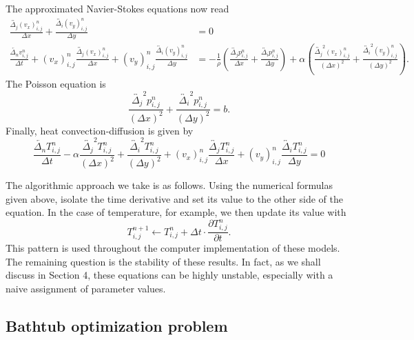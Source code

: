 \documentclass[12pt]{amsart}
\newcommand{\la}{\overleftarrow}
\newcommand{\ca}{\overleftrightarrow}
\begin{document}
The approximated Navier-Stokes equations now read
\begin{align}
    \frac{\ca{\Delta_{j}}(v_x)_{i,j}^n}{\Delta x} +
    \frac{\ca{\Delta_{i}}(v_y)_{i,j}^n}{\Delta y} &= 0 \\
    \frac{\la{\Delta_n}v^{n}_{i,j}}{\Delta t} + (v_x)_{i,j}^{n}
    \frac{\ca{\Delta_{j}}(v_x)_{i,j}^n}{\Delta x} + (v_y)_{i,j}^n
    \frac{\ca{\Delta_{i}}(v_y)_{i,j}^n}{\Delta y} &=
    -\frac{1}{\rho} \left(  \frac{\ca{\Delta_j}p_{i,j}^n}{\Delta
    x}+\frac{\ca{\Delta_i}p_{i,j}^n}{\Delta y}  \right) + \alpha
    \left(\frac{\ca{\Delta_{j}}^2(v_x)_{i,j}^n}{(\Delta x)^2} + 
    \frac{\ca{\Delta_{i}}^2(v_y)_{i,j}^n}{(\Delta y)^2}
    \right).
\end{align}
The Poisson equation is 
\begin{equation}
    \frac{\ca{\Delta_{j}}^2p_{i,j}^n}{(\Delta x)^2} + 
    \frac{\ca{\Delta_{i}}^2p_{i,j}^n}{(\Delta y)^2}
    = b.
    \label{eq:\theequation}
\end{equation}
Finally, heat convection-diffusion is given by
\begin{equation}
    \frac{\la{\Delta_n}T_{i,j}^n}{\Delta t} - \alpha \frac{\ca{\Delta_{j}}^2T_{i,j}^n}{(\Delta x)^2} + 
    \frac{\ca{\Delta_{i}}^2T_{i,j}^n}{(\Delta y)^2} + (v_x)_{i,j}^n
    \frac{\ca{\Delta_{j}}T_{i,j}^n}{\Delta x} + (v_y)_{i,j}^n
    \frac{\ca{\Delta_{i}}T_{i,j}^n}{\Delta y} = 0
    \label{eq:\theequation}
\end{equation}

The algorithmic approach we take is as follows. Using the numerical formulas
given above, isolate the time derivative and set its value to the other side of
the equation. In the case of temperature, for example, we then update its value
with
\begin{equation}
    T_{i,j}^{n+1} \leftarrow T_{i,j}^{n} + \Delta t \cdot \frac{\partial
        T_{i,j}^n}{\partial t}.
    \label{eq:\theequation}
\end{equation}
This pattern is used throughout the computer implementation of these models. The
remaining question is the stability of these results. In fact, as we shall
discuss in Section 4, these equations can be highly unstable, especially with a
naive assignment of parameter values.



\subsection{Bathtub optimization problem}
\end{document}
